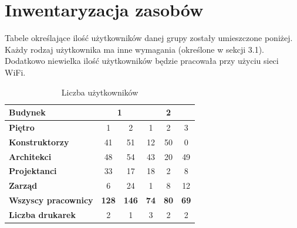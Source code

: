 \documentclass{article}
\begin{document}
\newpage
\section{Inwentaryzacja zasobów}
\par Tabele określające ilość użytkowników danej grupy zostały umieszczone poniżej. Każdy rodzaj użytkownika ma inne wymagania (określone w sekcji 3.1). Dodatkowo niewielka ilość użytkowników będzie pracowała przy użyciu sieci WiFi.

\begin{table}[H]
	\centering
	\caption{Liczba użytkowników}
\begin{tabular}{|l|c|c|c|c|c|}
	\hline
	\textbf{Budynek}                                                                   & \multicolumn{2}{c|}{1}      & \multicolumn{3}{c|}{2}                  \\ \hline
	\textbf{Piętro}                                                                    & 1            & 2            & 1           & 2           & 3           \\ \hline
	\textbf{Konstruktorzy}                                                             & 41           & 51           & 12          & 50          & 0           \\ \hline
	\textbf{Architekci}                                                                & 48           & 54           & 43          & 20          & 49          \\ \hline
	\textbf{Projektanci}                                                               & 33           & 17           & 18          & 2           & 8           \\ \hline
	\textbf{Zarząd}                                                                    & 6            & 24           & 1           & 8           & 12          \\ \hline
	\textbf{Wszyscy pracownicy}                                                        & \textbf{128} & \textbf{146} & \textbf{74} & \textbf{80} & \textbf{69} \\ \hline
	\textbf{Liczba drukarek}                                                           & 2            & 1            & 3           & 2           & 2           \\ \hline

\end{tabular}
\end{table}
\end{document}
